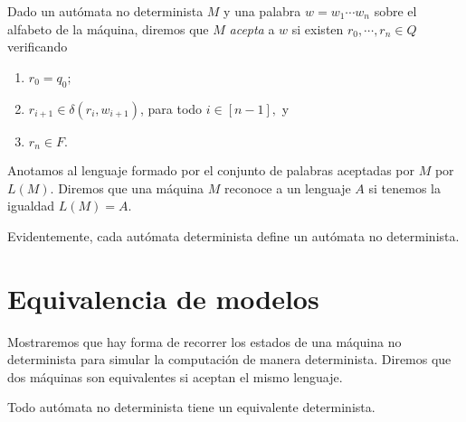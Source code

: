 Dado un aut\'omata no determinista \(M\) y una palabra \(w=w_1\cdots w_n\) sobre el alfabeto de la m\'aquina, diremos que \(M\) \emph{acepta} a \(w\) si existen \(r_0,\cdots,r_n\in Q\) verificando
\begin{enumerate}
    \item \(r_0=q_0;\)
    \item \(r_{i+1}\in \delta(r_i,w_{i+1})\), para todo \(i\in [n-1],\) y
    \item \(r_n\in F.\)
\end{enumerate}
Anotamos al lenguaje formado por el conjunto de palabras aceptadas por \( M \) por \(L(M).\)
Diremos que una m\'aquina \(M\) reconoce a un lenguaje \(A\) si tenemos la igualdad \(L(M)=A.\)

\begin{obs}
    Evidentemente, cada aut\'omata determinista define un aut\'omata no determinista.
\end{obs}

\section{Equivalencia de modelos}

Mostraremos que hay forma de recorrer los estados de una m\'aquina no determinista para simular la computaci\'on de manera determinista. Diremos que dos m\'aquinas son equivalentes si aceptan el mismo lenguaje.

\begin{lema}
    Todo aut\'omata no determinista tiene un equivalente determinista.
\end{lema}

